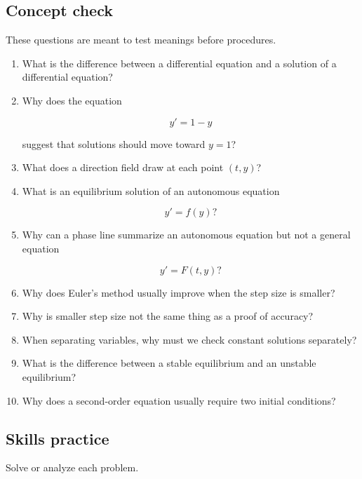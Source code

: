 \subsection{Concept check}
\label{subsec:de-concept-check}

These questions are meant to test meanings before procedures.

\begin{enumerate}
\item What is the difference between a differential equation and a solution of a
differential equation?

\item Why does the equation

\[
y'=1-y
\]

suggest that solutions should move toward \(y=1\)?

\item What does a direction field draw at each point \((t,y)\)?

\item What is an equilibrium solution of an autonomous equation

\[
y'=f(y)?
\]

\item Why can a phase line summarize an autonomous equation but not a general
equation

\[
y'=F(t,y)?
\]

\item Why does Euler's method usually improve when the step size is smaller?

\item Why is smaller step size not the same thing as a proof of accuracy?

\item When separating variables, why must we check constant solutions separately?

\item What is the difference between a stable equilibrium and an unstable equilibrium?

\item Why does a second-order equation usually require two initial conditions?
\end{enumerate}

\subsection{Skills practice}
\label{subsec:de-skills-practice}

Solve or analyze each problem.

